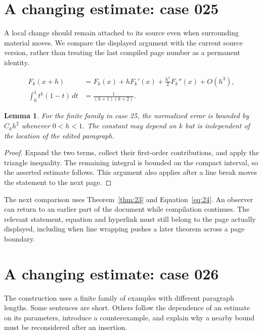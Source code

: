 \documentclass[a4paper,10pt]{article}
\newtheorem{lemma}[theorem]{Lemma}
\begin{document}
\lipsum[18]

\section{A changing estimate: case 025}\label{unit:24}
A local change should remain attached to its source even when surrounding material moves. We compare the displayed argument with the current source version, rather than treating the last compiled page number as a permanent identity.

\lipsum[13-14]
\begin{align}\label{eq:24}
 F_k(x+h)&=F_k(x)+hF_k'(x)+\frac{h^2}{2}F_k''(x)+O(h^3),\\
 \int_0^1 t^k(1-t)\,dt&=\frac{1}{(k+1)(k+2)}.
\end{align}
\begin{lemma}\label{thm:24}
For the finite family in case 25, the normalized error is bounded by $C_k h^2$ whenever $0<h<1$. The constant may depend on $k$ but is independent of the location of the edited paragraph.
\end{lemma}
\begin{proof}
Expand the two terms, collect their first-order contributions, and apply the
triangle inequality. The remaining integral is bounded on the compact interval,
so the asserted estimate follows. This argument also applies after a line break
moves the statement to the next page.
\end{proof}
The next comparison uses Theorem~\ref{thm:23} and Equation~\ref{eq:24}. An observer can return to an earlier part of the document while compilation continues. The relevant statement, equation and hyperlink must still belong to the page actually displayed, including when line wrapping pushes a later theorem across a page boundary.

\lipsum[23]

\section{A changing estimate: case 026}\label{unit:25}
The construction uses a finite family of examples with different paragraph lengths. Some sentences are short. Others follow the dependence of an estimate on its parameters, introduce a counterexample, and explain why a nearby bound must be reconsidered after an insertion.
\end{document}
